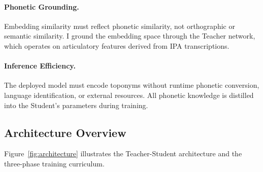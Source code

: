 \documentclass[11pt,a4paper]{article}
\begin{document}
\paragraph{Phonetic Grounding.} Embedding similarity must reflect phonetic similarity, not orthographic or semantic similarity. I ground the embedding space through the Teacher network, which operates on articulatory features derived from IPA transcriptions.

\paragraph{Inference Efficiency.} The deployed model must encode toponyms without runtime phonetic conversion, language identification, or external resources. All phonetic knowledge is distilled into the Student's parameters during training.

\subsection{Architecture Overview}

Figure~\ref{fig:architecture} illustrates the Teacher-Student architecture and the three-phase training curriculum.
\end{document}
